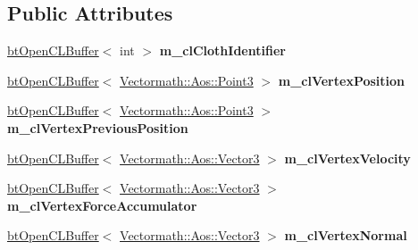 \subsection*{Public Attributes}
\begin{DoxyCompactItemize}
\item 
\mbox{\label{classbtSoftBodyVertexDataOpenCL_ae59305b4f665045ad8244714a78dbe86}} 
\hyperlink{classbtOpenCLBuffer}{bt\+Open\+C\+L\+Buffer}$<$ int $>$ {\bfseries m\+\_\+cl\+Cloth\+Identifier}
\item 
\mbox{\label{classbtSoftBodyVertexDataOpenCL_aef54ad0da16ce71e85ddb751353d2b57}} 
\hyperlink{classbtOpenCLBuffer}{bt\+Open\+C\+L\+Buffer}$<$ \hyperlink{classVectormath_1_1Aos_1_1Point3}{Vectormath\+::\+Aos\+::\+Point3} $>$ {\bfseries m\+\_\+cl\+Vertex\+Position}
\item 
\mbox{\label{classbtSoftBodyVertexDataOpenCL_a1141cac9be233ffb85159db9307289b0}} 
\hyperlink{classbtOpenCLBuffer}{bt\+Open\+C\+L\+Buffer}$<$ \hyperlink{classVectormath_1_1Aos_1_1Point3}{Vectormath\+::\+Aos\+::\+Point3} $>$ {\bfseries m\+\_\+cl\+Vertex\+Previous\+Position}
\item 
\mbox{\label{classbtSoftBodyVertexDataOpenCL_a0a7e4512b481a778fae1e62f770ca142}} 
\hyperlink{classbtOpenCLBuffer}{bt\+Open\+C\+L\+Buffer}$<$ \hyperlink{classVectormath_1_1Aos_1_1Vector3}{Vectormath\+::\+Aos\+::\+Vector3} $>$ {\bfseries m\+\_\+cl\+Vertex\+Velocity}
\item 
\mbox{\label{classbtSoftBodyVertexDataOpenCL_a37b9948ab6e0d4c68c2c1f97c3c5302e}} 
\hyperlink{classbtOpenCLBuffer}{bt\+Open\+C\+L\+Buffer}$<$ \hyperlink{classVectormath_1_1Aos_1_1Vector3}{Vectormath\+::\+Aos\+::\+Vector3} $>$ {\bfseries m\+\_\+cl\+Vertex\+Force\+Accumulator}
\item 
\mbox{\label{classbtSoftBodyVertexDataOpenCL_a3f1f12d049efa2225eb068abfa7e97a3}} 
\hyperlink{classbtOpenCLBuffer}{bt\+Open\+C\+L\+Buffer}$<$ \hyperlink{classVectormath_1_1Aos_1_1Vector3}{Vectormath\+::\+Aos\+::\+Vector3} $>$ {\bfseries m\+\_\+cl\+Vertex\+Normal}
\item 
\mbox{\label{classbtSoftBodyVertexDataOpenCL_a938c3ea6f58e1524442632988e1376b1}} 

\end{DoxyCompactItemize}
